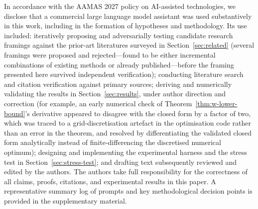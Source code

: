 \documentclass[sigconf,anonymous]{aamas}
\theoremstyle{plain}
\theoremstyle{definition}
\begin{document}
In accordance with the AAMAS 2027 policy on AI-assisted technologies, we
disclose that a commercial large language model assistant was used
substantively in this work, including in the formation of hypotheses and
methodology. Its use included: iteratively proposing and adversarially
testing candidate research framings against the prior-art literatures
surveyed in Section~\ref{sec:related} (several framings were proposed and
rejected---found to be either incremental combinations of existing methods
or already published---before the framing presented here survived
independent verification); conducting literature search and citation
verification against primary sources; deriving and numerically validating
the results in Section~\ref{sec:results}, under author direction and
correction (for example, an early numerical check of
Theorem~\ref{thm:w-lower-bound}'s derivative appeared to disagree with the
closed form by a factor of two, which was traced to a grid-discretisation
artefact in the optimisation code rather than an error in the theorem, and
resolved by differentiating the validated closed form analytically instead
of finite-differencing the discretised numerical optimum); designing and
implementing the experimental harness and the stress test in
Section~\ref{sec:stress-test}; and drafting text subsequently reviewed and
edited by the authors. The authors take full responsibility for the
correctness of all claims, proofs, citations, and experimental results in
this paper. A representative summary log of prompts and key methodological
decision points is provided in the supplementary material.




\end{document}
